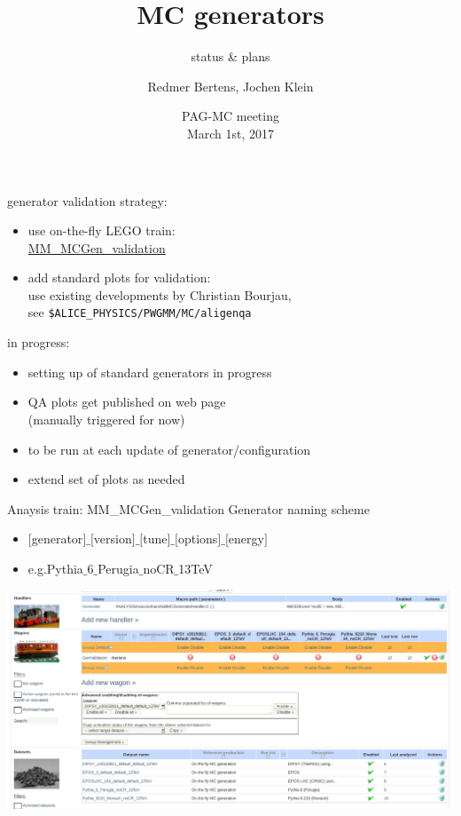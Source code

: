 \documentclass[table]{beamer}
\title{MC generators}
\subtitle{status \& plans}
\author[Redmer, jkl]{Redmer Bertens\inst{1}, Jochen Klein\inst{2}}
\institute[]{
  \inst{1} University of Tennessee, Knoxville \and
  \inst{2} CERN, Geneva
}
\date[PAG-MC, Mar 1, 2017]{
  PAG-MC meeting\\[.2cm]
  March 1st, 2017
}
\begin{document}
{
  \begin{frame}
    \titlepage
  \end{frame}
}

\begin{frame}{generator validation}
  strategy:
  \begin{itemize}
    \setlength{\itemsep}{.25cm}
  \item use on-the-fly LEGO train:\\
    \href{https://alimonitor.cern.ch/trains/train.jsp?train_id=107}{MM\_MCGen\_validation}
  \item add standard plots for validation:\\[.2cm]
    use existing developments by Christian Bourjau,\\
    see \texttt{\$ALICE\_PHYSICS/PWGMM/MC/aligenqa}
  \end{itemize}
  \vspace{.25cm}
  in progress:
  \begin{itemize}
    \setlength{\itemsep}{.25cm}
  \item setting up of standard generators in progress
  \item QA plots get published on web page\\
    (manually triggered for now)
  \item to be run at each update of generator/configuration
  \item extend set of plots as needed
  \end{itemize}
\end{frame}

\begin{frame}{Anaysis train: MM\_MCGen\_validation}
Generator naming scheme
\begin{itemize}
    \item $[$generator$]\_[$version$]\_[$tune$]\_[$options$]\_[$energy$]$
        \item e.g.Pythia$\_$6$\_$Perugia$\_$noCR$\_$13TeV
\end{itemize}
\includegraphics[width=\textwidth]{../fig/pwg_mm_lego_train.png}
\end{frame}
\end{document}

